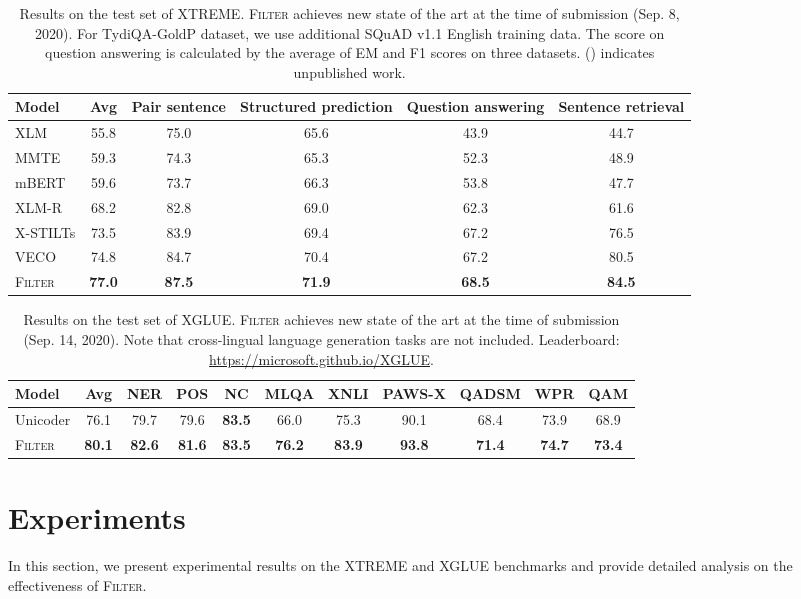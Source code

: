 \begin{table*}[!htb]
\begin{adjustbox}{scale=0.95,center}
\begin{tabular}{lccccc}
\toprule
Model & Avg & Pair sentence & Structured prediction & Question answering & Sentence retrieval \\
\midrule
XLM             & 55.8 & 75.0 & 65.6  & 43.9 & 44.7 \\
MMTE            & 59.3 & 74.3 & 65.3  & 52.3 & 48.9 \\
mBERT           & 59.6 & 73.7 & 66.3  & 53.8 & 47.7 \\
XLM-R           & 68.2 & 82.8  & 69.0 & 62.3 & 61.6 \\
X-STILTs         & 73.5 & 83.9  & 69.4 & 67.2 & 76.5 \\
VECO            & 74.8	& 84.7 & 70.4 & 67.2 & 80.5 \\
\midrule
\textsc{Filter}            & \textbf{77.0} & \textbf{87.5} & \textbf{71.9} & \textbf{68.5} & \textbf{84.5} \\
\bottomrule
\end{tabular}
\end{adjustbox}
\caption{Results on the test set of XTREME. \textsc{Filter} achieves new state of the art at the time of submission (Sep. 8, 2020). For TydiQA-GoldP dataset, we use additional SQuAD v1.1 English training data. The score on question answering is calculated by the average of EM and F1 scores on three datasets. () indicates unpublished work.
}
\label{tbl:leaderboard}
\end{table*} \begin{table*}[t!]
\centering
\begin{adjustbox}{scale=0.95,center}
\begin{tabular}{lcccccccccc}
\toprule

Model & Avg & NER & POS	& NC & MLQA & XNLI & PAWS-X & QADSM & WPR & QAM \\
\midrule
Unicoder & 76.1 & 79.7 & 79.6	& \textbf{83.5} & 66.0 & 75.3 & 90.1 & 68.4 & 73.9 & 68.9 \\
\midrule
\textsc{Filter} & \textbf{80.1} & \textbf{82.6} & \textbf{81.6} & \textbf{83.5} & \textbf{76.2} & \textbf{83.9} & \textbf{93.8} & \textbf{71.4} & \textbf{74.7} & \textbf{73.4} \\
\bottomrule
\end{tabular}
\end{adjustbox}
\caption{Results on the test set of XGLUE. \textsc{Filter} achieves new state of the art at the time of submission (Sep. 14, 2020). Note that cross-lingual language generation tasks are not included.
Leaderboard: \href{https://microsoft.github.io/XGLUE}{https://microsoft.github.io/XGLUE}.}
\label{tbl:xglue_leaderboard}
\end{table*} \section{Experiments}
In this section, we present experimental results on the XTREME and XGLUE benchmarks and provide detailed analysis on the effectiveness of \textsc{Filter}.


